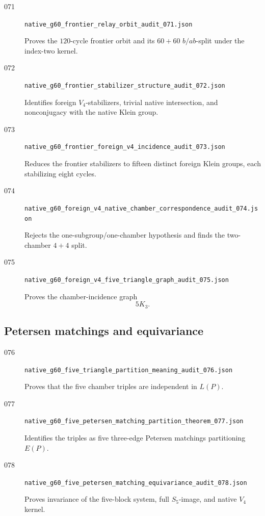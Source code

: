 \begin{description}
    \item[071]
    \texttt{native\_g60\_frontier\_relay\_orbit\_audit\_071.json}

    Proves the \(120\)-cycle frontier orbit and its \(60+60\)
    \(b/ab\)-split under the index-two kernel.

    \item[072]
    \texttt{native\_g60\_frontier\_stabilizer\_structure\_audit\_072.json}

    Identifies foreign \(V_4\)-stabilizers, trivial native intersection,
    and nonconjugacy with the native Klein group.

    \item[073]
    \texttt{native\_g60\_frontier\_foreign\_v4\_incidence\_audit\_073.json}

    Reduces the frontier stabilizers to fifteen distinct foreign Klein
    groups, each stabilizing eight cycles.

    \item[074]
    \texttt{native\_g60\_foreign\_v4\_native\_chamber\_correspondence\_audit\_074.json}

    Rejects the one-subgroup/one-chamber hypothesis and finds the
    two-chamber \(4+4\) split.

    \item[075]
    \texttt{native\_g60\_foreign\_v4\_five\_triangle\_graph\_audit\_075.json}

    Proves the chamber-incidence graph
    \[
    5K_3.
    \]
\end{description}

\subsection{Petersen matchings and equivariance}

\begin{description}
    \item[076]
    \texttt{native\_g60\_five\_triangle\_partition\_meaning\_audit\_076.json}

    Proves that the five chamber triples are independent in
    \(L(P)\).

    \item[077]
    \texttt{native\_g60\_five\_petersen\_matching\_partition\_theorem\_077.json}

    Identifies the triples as five three-edge Petersen matchings
    partitioning \(E(P)\).

    \item[078]
    \texttt{native\_g60\_five\_petersen\_matching\_equivariance\_audit\_078.json}

    Proves invariance of the five-block system, full \(S_5\)-image,
    and native \(V_4\) kernel.
\end{description}

